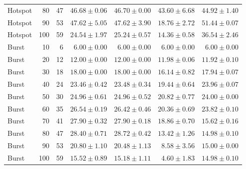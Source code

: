 \begin{table}[htbp]
\begin{tabular*}{\linewidth}{@{\extracolsep{\fill}}lrrrrrr}
Hotspot & 80 & 47 & $46.68 \pm 0.06$ & $46.70 \pm 0.00$ & $43.60 \pm 6.68$ & $44.92 \pm 1.40$\\
Hotspot & 90 & 53 & $47.62 \pm 5.05$ & $47.62 \pm 3.90$ & $18.76 \pm 2.72$ & $51.44 \pm 0.07$\\
Hotspot & 100 & 59 & $24.54 \pm 1.97$ & $25.24 \pm 0.57$ & $14.36 \pm 0.58$ & $36.54 \pm 2.46$\\
\midrule
Burst & 10 & 6 & $6.00 \pm 0.00$ & $6.00 \pm 0.00$ & $6.00 \pm 0.00$ & $6.00 \pm 0.00$\\
Burst & 20 & 12 & $12.00 \pm 0.00$ & $12.00 \pm 0.00$ & $11.98 \pm 0.06$ & $11.92 \pm 0.10$\\
Burst & 30 & 18 & $18.00 \pm 0.00$ & $18.00 \pm 0.00$ & $16.14 \pm 0.82$ & $17.94 \pm 0.07$\\
Burst & 40 & 24 & $23.46 \pm 0.42$ & $23.48 \pm 0.34$ & $19.44 \pm 0.64$ & $23.96 \pm 0.07$\\
Burst & 50 & 30 & $24.96 \pm 0.61$ & $24.96 \pm 0.52$ & $20.82 \pm 0.77$ & $24.00 \pm 0.00$\\
Burst & 60 & 35 & $26.54 \pm 0.19$ & $26.42 \pm 0.46$ & $20.36 \pm 0.69$ & $23.82 \pm 0.10$\\
Burst & 70 & 41 & $27.90 \pm 0.32$ & $27.90 \pm 0.18$ & $18.86 \pm 0.70$ & $15.62 \pm 0.16$\\
Burst & 80 & 47 & $28.40 \pm 0.71$ & $28.72 \pm 0.42$ & $13.42 \pm 1.26$ & $14.98 \pm 0.10$\\
Burst & 90 & 53 & $20.80 \pm 1.10$ & $20.48 \pm 1.13$ & $8.58 \pm 3.56$ & $15.00 \pm 0.00$\\
Burst & 100 & 59 & $15.52 \pm 0.89$ & $15.18 \pm 1.11$ & $4.60 \pm 1.83$ & $14.98 \pm 0.10$\\
\bottomrule\end{tabular*}\end{table}
\clearpage
